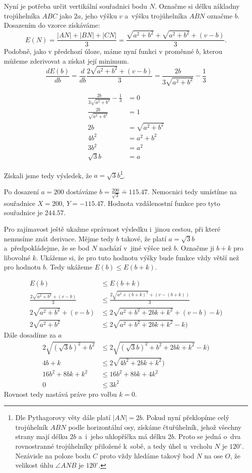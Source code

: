 \documentclass[12pt,a4paper]{article}
\begin{document}
Nyní je potřeba určit vertikální souřadnici bodu $N$.
Označme si délku základny trojúhelníka $ABC$ jako $2a$, jeho výšku $v$ a~výšku trojúhelníka $ABN$ označme $b$. Dosazením do vzorce získáváme:
$$E(N) = \frac{|AN| + |BN| + |CN|}{3} = \frac{\sqrt{a^2+b^2} + \sqrt{a^2+b^2} + (v - b)}{3}.$$
Podobně, jako v předchozí úloze, máme nyní funkci v proměnné $b$, kterou můžeme zderivovat a získat její minimum.
$$\frac{d E(b)}{db} = \frac{d}{db}\frac{2 \sqrt{a^2+b^2} + (v - b)}{3} = \frac{2b}{3 \sqrt{a^2+b^2}} - \frac{1}{3}$$

\begin{align}
\frac{2b}{3 \sqrt{a^2+b^2}} - \frac{1}{3} &= 0 \nonumber \\
\frac{2b}{\sqrt{a^2+b^2}} &= 1 \nonumber \\
2b &= \sqrt{a^2+b^2} \nonumber \\
4b^2 &= a^2 + b^2 \nonumber \\
3b^2 &= a^2 \nonumber \\
\sqrt{3}b &= a \nonumber
\end{align}

Získali jsme tedy výsledek, že $a = \sqrt{3}b$\footnote{Dle Pythagorovy věty dále platí
$|AN|=2b$. Pokud nyní překlopíme celý trojúhelník $ABN$ podle horizontální osy,
získáme čtuřúhelník, jehož všechny strany mají délku $2b$ a~i~jeho uhlopříčka má délku $2b$. Proto se jedná o~dva rovnostranné trojúhelníky přiložené k~sobě, a tedy úhel u~vrcholu $N$ je $120^\circ$.
Nezávisle na poloze bodu $C$ proto vždy hledáme takový bod $N$ na ose $O$, že velikost úhlu $\angle ANB$ je $120^\circ$.}.

Po dosazení $a = 200$ dostáváme $b = \frac{200}{\sqrt{3}}
\doteq 115.47$. Nemocnici tedy umístíme na souřadnice $X = 200$, $Y = -115.47$.
Hodnota vzdálenostní funkce pro tyto souřadnice je $244.57$.

Pro zajímavost ještě ukažme správnost výsledku i~jinou cestou, při které nemusíme znát derivace. Mějme tedy $b$ takové, že platí $a = \sqrt{3}b$ a~předpokládejme, že se bod $N$ nachází v~jiné výšce než $b$.
Označme ji $b+k$ pro libovolné $k$. Ukážeme si, že pro tuto hodnotu výšky bude funkce vždy větší než pro hodnotu $b$. Tedy ukážeme $E(b) \leq E(b+k)$.

\begin{align}
	E(b) &\leq E(b+k) \nonumber \\
	\frac{2 \sqrt{a^2+b^2} + (v - b)}{3} &\leq \frac{2 \sqrt{a^2+(b+k)^2} + (v - (b+k))}{3} \nonumber \\
	2 \sqrt{a^2+b^2} + (v - b) &\leq 2 \sqrt{a^2+b^2+2bk+k^2} + (v - b) - k) \nonumber \\
	2 \sqrt{a^2+b^2} &\leq 2 \sqrt{a^2+b^2+2bk+k^2} - k) \nonumber
\end{align}
	Dále dosadíme za $a$
\begin{align}
	2 \sqrt{(\sqrt{3}b)^2+b^2} &\leq 2 \sqrt{(\sqrt{3}b)^2+b^2+2bk+k^2} - k) \nonumber \\
	4b + k &\leq 2 \sqrt{4b^2+2bk+k^2}) \nonumber \\
	16b^2 + 8bk + k^2 &\leq 16b^2+8bk+4k^2 \nonumber \\
	0 &\leq 3k^2 \nonumber
\end{align}
Rovnost tedy nastává práve pro volbu $k=0$.
\end{document}
